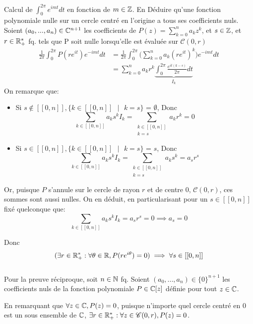 \documentclass{article}
\begin{document}
\begin{question_kholle}{Calcul de $\int_0^{2\pi}e^{imt}dt$ en fonction de $m \in \mathbb Z$. En Déduire qu'une fonction polynomiale nulle sur un cercle centré en l'origine a tous ses coefficients nuls.}
	Soient $(a_0, ..., a_n) \in \mathbb C^{n+1}$ les coefficients de $P(z) = \sum_{k=0}^n a_k z^k$, et $s\in \mathbb Z$, et $r \in \mathbb R_+^*$ fq. tels que P soit nulle lorsqu'elle est évaluée sur $\mathscr C(0,r)$
	\begin{align*}
		\frac{1}{2 \pi} \int_0^{2\pi} P(re^{it}) e^{-imt}dt &= \frac{1}{2 \pi} \int_0^{2\pi} \bigg (\sum_{k=0}^n a_k (re^{it})^k \bigg) e^{-imt}dt\\
		&= \sum_{k=0}^n a_k r^k \underbrace{\int_0^{2\pi} \frac{e^{it(k-s)}}{2 \pi} dt}_{I_k}
	\end{align*}
	On remarque que:
	\begin{itemize}
		\item Si $s \notin [[0, n]], \{k \in [[0, n]] \text{ }| \text{ } k = s\}$ = $\emptyset$, Donc $$\sum_{k \in [[0, n]]} a_k s^k I_k  = \sum_{\substack{k \in [[0, n]] \\ k = s}} a_k r^k  = 0$$
		\item Si $s \in [[0, n]], \{k \in [[0, n]] \text{ }| \text{ } k = s\}$ = ${s}$, Donc $$\sum_{k \in [[0, n]]} a_k s^k I_k = \sum_{\substack{k \in [[0, n]] \\ k = s}} a_k s^k = a_s r^s \label{1}$$
	\end{itemize}
	Or, puisque $P$ s'annule sur le cercle de rayon $r$ et de centre $0$,  $\mathscr C(0,r)$, ces sommes sont aussi nulles. On en déduit, en particularisant pour un $s \in [[0, n]]$ fixé quelconque que:
	$$
		\sum_{k \in [[0, n]]} a_k s^k I_k = a_sr^s = 0 \implies a_s = 0
	$$
	
	Donc $$
		(\exists r \in \mathbb R_+^* : \forall \theta \in \mathbb R, P(re^{i\theta})=0) \implies \forall s \in [[0, n]]
	$$
	\\
	Pour la preuve réciproque,  soit $n \in \mathbb N$ fq. Soient $(a_0,...,a_n) \in \{ 0 \} ^{n+1}$ les coefficients nuls de la fonction polynomiale $P \in \mathbb C[z]$ définie pour tout $z \in \mathbb C$.
	
	En remarquant que $\forall z \in \mathbb C , P(z) = 0$, puisque n'importe quel cercle centré en 0 est un sous ensemble de $\mathbb C$,  $\exists r \in \mathbb R_+^*: \forall z \in \mathscr C(0, r), P(z) = 0$.
\end{question_kholle}
\end{document}
